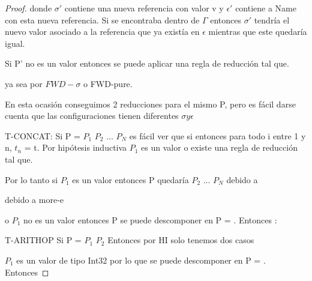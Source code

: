 \begin{proof}
 \fullarrow {}

donde $\sigma'$ contiene una nueva referencia con valor v y $\epsilon'$
 contiene a Name con esta nueva referencia.
Si  se encontraba dentro de $\Gamma$ entonces $\sigma'$
 tendría el nuevo valor asociado a la referencia
que ya existía en $\epsilon$ mientras que este quedaría igual.

Si P' no es un valor entonces se puede aplicar una regla de reducción tal que.

  \fullarrow {} ya sea por $FWD-\sigma$ o FWD-pure.

En esta ocasión conseguimos 2 reducciones para el mismo P, pero es fácil darse cuenta que las configuraciones  tienen diferentes $\sigma y \epsilon$

T-CONCAT: Si P = $P_{1}$ $P_{2}$ ... $P_{N}$ es fácil ver que si
entonces  para todo i entre 1 y n, $t_{n}$ = t.
 Por hipótesis inductiva $P_{1}$ es un valor o existe una regla de reducción tal que.

 \fullarrow {}

Por lo tanto si $P_{1}$ es un valor entonces P quedaría $P_{2}$ ... $P_{N}$ debido a 

  \progarrow {} debido a more-e

o $P_{1}$ no es un valor entonces P se puede descomponer en P = . Entonces :

 \fullarrow {}

T-ARITHOP Si P = $P_{1}$  $P_{2}$ Entonces por HI solo tenemos dos casos
 
$P_{1}$ es un valor de tipo Int32 por lo que se puede descomponer en P = . Entonces

 \fullarrow {}


\end{proof}
